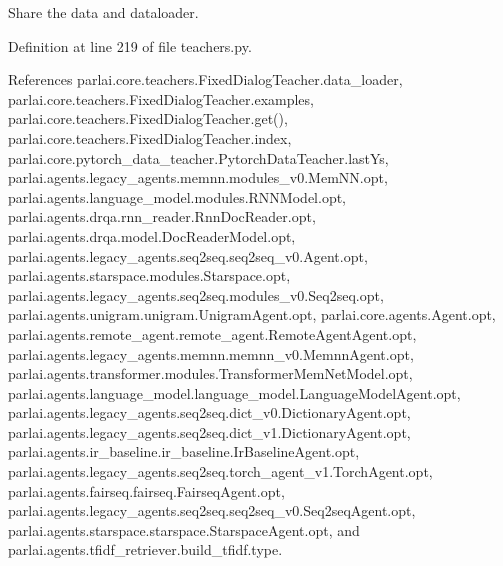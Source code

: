 \begin{DoxyVerb}Share the data and dataloader.\end{DoxyVerb}
 

Definition at line 219 of file teachers.\+py.



References parlai.\+core.\+teachers.\+Fixed\+Dialog\+Teacher.\+data\+\_\+loader, parlai.\+core.\+teachers.\+Fixed\+Dialog\+Teacher.\+examples, parlai.\+core.\+teachers.\+Fixed\+Dialog\+Teacher.\+get(), parlai.\+core.\+teachers.\+Fixed\+Dialog\+Teacher.\+index, parlai.\+core.\+pytorch\+\_\+data\+\_\+teacher.\+Pytorch\+Data\+Teacher.\+last\+Ys, parlai.\+agents.\+legacy\+\_\+agents.\+memnn.\+modules\+\_\+v0.\+Mem\+N\+N.\+opt, parlai.\+agents.\+language\+\_\+model.\+modules.\+R\+N\+N\+Model.\+opt, parlai.\+agents.\+drqa.\+rnn\+\_\+reader.\+Rnn\+Doc\+Reader.\+opt, parlai.\+agents.\+drqa.\+model.\+Doc\+Reader\+Model.\+opt, parlai.\+agents.\+legacy\+\_\+agents.\+seq2seq.\+seq2seq\+\_\+v0.\+Agent.\+opt, parlai.\+agents.\+starspace.\+modules.\+Starspace.\+opt, parlai.\+agents.\+legacy\+\_\+agents.\+seq2seq.\+modules\+\_\+v0.\+Seq2seq.\+opt, parlai.\+agents.\+unigram.\+unigram.\+Unigram\+Agent.\+opt, parlai.\+core.\+agents.\+Agent.\+opt, parlai.\+agents.\+remote\+\_\+agent.\+remote\+\_\+agent.\+Remote\+Agent\+Agent.\+opt, parlai.\+agents.\+legacy\+\_\+agents.\+memnn.\+memnn\+\_\+v0.\+Memnn\+Agent.\+opt, parlai.\+agents.\+transformer.\+modules.\+Transformer\+Mem\+Net\+Model.\+opt, parlai.\+agents.\+language\+\_\+model.\+language\+\_\+model.\+Language\+Model\+Agent.\+opt, parlai.\+agents.\+legacy\+\_\+agents.\+seq2seq.\+dict\+\_\+v0.\+Dictionary\+Agent.\+opt, parlai.\+agents.\+legacy\+\_\+agents.\+seq2seq.\+dict\+\_\+v1.\+Dictionary\+Agent.\+opt, parlai.\+agents.\+ir\+\_\+baseline.\+ir\+\_\+baseline.\+Ir\+Baseline\+Agent.\+opt, parlai.\+agents.\+legacy\+\_\+agents.\+seq2seq.\+torch\+\_\+agent\+\_\+v1.\+Torch\+Agent.\+opt, parlai.\+agents.\+fairseq.\+fairseq.\+Fairseq\+Agent.\+opt, parlai.\+agents.\+legacy\+\_\+agents.\+seq2seq.\+seq2seq\+\_\+v0.\+Seq2seq\+Agent.\+opt, parlai.\+agents.\+starspace.\+starspace.\+Starspace\+Agent.\+opt, and parlai.\+agents.\+tfidf\+\_\+retriever.\+build\+\_\+tfidf.\+type.

